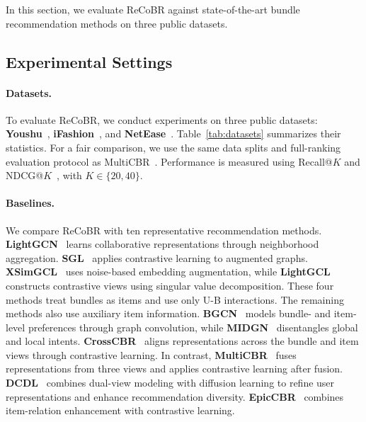 \documentclass[letterpaper]{article}
\begin{document}
In this section, we evaluate ReCoBR against state-of-the-art bundle
recommendation methods on three public datasets.

\subsection{Experimental Settings}


\paragraph{Datasets.}
To evaluate ReCoBR, we conduct experiments on three public
datasets: \textbf{Youshu}~\cite{chen2019dam},
\textbf{iFashion}~\cite{chen2019pog}, and
\textbf{NetEase}~\cite{cao2017efm}.
Table~\ref{tab:datasets} summarizes their statistics.
For a fair comparison, we use the same data splits and
full-ranking evaluation protocol as MultiCBR~\cite{ma2024multicbr}.
Performance is measured using Recall@$K$ and
NDCG@$K$~\cite{wang2019ngcf}, with $K\in\{20,40\}$.

\paragraph{Baselines.}
We compare ReCoBR with ten representative recommendation
methods. \textbf{LightGCN}~\cite{he2020lightgcn} learns collaborative
representations through neighborhood aggregation.
\textbf{SGL}~\cite{wu2021sgl} applies contrastive learning to augmented
graphs. \textbf{XSimGCL}~\cite{yu2024xsimgcl} uses noise-based embedding
augmentation, while \textbf{LightGCL}~\cite{cai2023lightgcl} constructs
contrastive views using singular value decomposition.
These four methods treat bundles as items and use only U-B
interactions. The remaining methods also use auxiliary item information.
\textbf{BGCN}~\cite{chang2020bgcn} models bundle- and item-level
preferences through graph convolution, while
\textbf{MIDGN}~\cite{zhao2022midgn} disentangles global and local intents.
\textbf{CrossCBR}~\cite{ma2022crosscbr} aligns representations across
the bundle and item views through contrastive learning.
In contrast, \textbf{MultiCBR}~\cite{ma2024multicbr} fuses representations
from three views and applies contrastive learning after fusion.
\textbf{DCDL}~\cite{chen2025dcdl} combines dual-view modeling with
diffusion learning to refine user representations and enhance
recommendation diversity. \textbf{EpicCBR}~\cite{li2026epiccbr}
combines item-relation enhancement with contrastive learning.
\end{document}
